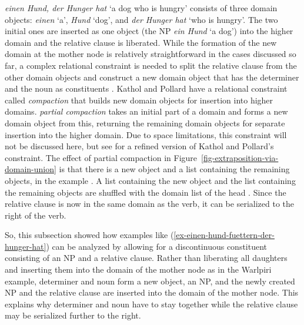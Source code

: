 \documentclass[output=paper]{langsci/langscibook}
\begin{document}
\emph{einen Hund, der Hunger hat} `a dog who is hungry' consists of three domain objects:
\emph{einen} `a', \emph{Hund} `dog', and \emph{der Hunger hat} `who is hungry'. The two initial ones
are inserted as one object (the NP \emph{ein Hund} `a dog') into the higher domain
and the relative clause is liberated. While the formation of the new domain at the mother node is
relatively straightforward in the cases discussed so far, a complex relational constraint is needed
to split the relative clause  from the other domain objects and construct a new domain
object that has the determiner and the noun as constituents . Kathol and Pollard have a relational constraint called
\textit{compaction} that builds new domain objects for insertion into higher
domains. \textit{partial compaction} takes an initial part of a domain and forms a new domain object
from this, returning the remaining domain objects for separate insertion into the higher domain. Due
to space limitations, this constraint will not be discussed here, but see  for a refined version of Kathol and Pollard's constraint. The effect of partial
compaction in Figure~\ref{fig-extraposition-via-domain-union} is that there is a new object 
and a list containing the remaining objects, in the example . A list containing
the new object  and the list containing the remaining objects  are
shuffled with the domain list of the head . Since the relative clause is now in the same domain
as the verb, it can be serialized to the right of the verb.

So, this subsection showed how examples like (\ref{ex-einen-hund-fuettern-der-hunger-hat}) can be
analyzed by allowing for a discontinuous constituent consisting of an NP and a relative
clause. Rather than liberating all daughters and inserting them into the domain of the mother node
as in the Warlpiri example, determiner and noun form a new object, an NP, and the newly created NP
and the relative clause are inserted into the domain of the mother node. This explains why
determiner and noun have to stay together while the relative clause may be serialized further to the right.

\end{document}
